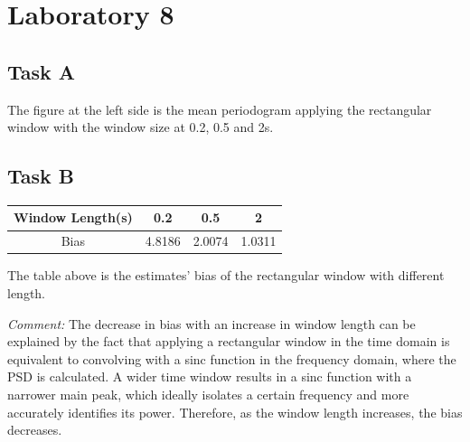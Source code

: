 \documentclass[8pt]{article}  %
\theoremstyle{plain}
\theoremstyle{definition}
\theoremstyle{remark}
\begin{document}
    
    \newpage
    
    
    
    \section{Laboratory 8}
    \begin{minipage}{0.5\textwidth}
        \subsection{Task A }

        The figure at the left side is the mean periodogram 
        applying the rectangular window with the window size at 0.2, 0.5
        and 2s. 

        \vspace{0.15cm}

        \subsection{Task B}

        \vspace{0.15cm}

        \centering
        \begin{tabular}{|c|c|c|c|}  %
            \hline
            Window Length(s)& 0.2 & 0.5 & 2  \\
            \hline
            Bias & 4.8186 & 2.0074 & 1.0311\\
            \hline
        \end{tabular}
        
        \vspace{0.3cm}

        The table above is the estimates' bias of the rectangular window with different 
        length.

        \vspace{0.15cm}
        \textit{Comment:} 
        The decrease in bias with an increase in window length can be explained by the fact that 
        applying a rectangular window in the time domain is equivalent to 
        convolving with a sinc function in the frequency domain, 
        where the PSD is calculated. 
        A wider time window results in a sinc function with a narrower main peak, 
        which ideally isolates a certain frequency and more accurately identifies its power. 
        Therefore, as the window length increases, the bias decreases.
    \end{minipage}
\end{document}
